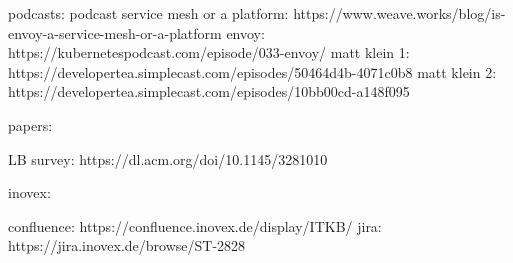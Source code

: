 podcasts:
podcast service mesh or a platform: https://www.weave.works/blog/is-envoy-a-service-mesh-or-a-platform
envoy: https://kubernetespodcast.com/episode/033-envoy/
matt klein 1: https://developertea.simplecast.com/episodes/50464d4b-4071c0b8
matt klein 2: https://developertea.simplecast.com/episodes/10bb00cd-a148f095

papers:

LB survey: https://dl.acm.org/doi/10.1145/3281010

inovex:

confluence: https://confluence.inovex.de/display/ITKB/%
jira: https://jira.inovex.de/browse/ST-2828
